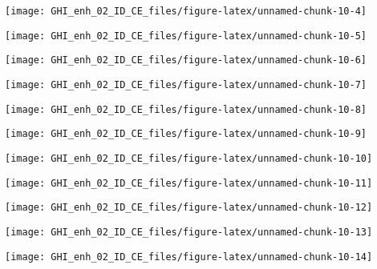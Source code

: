 \documentclass[
  10pt,
  a4paper,oneside]{article}
\begin{document}
\begin{center}\texttt{[image: GHI\_enh\_02\_ID\_CE\_files/figure-latex/unnamed-chunk-10-4]} \end{center}

\begin{center}\texttt{[image: GHI\_enh\_02\_ID\_CE\_files/figure-latex/unnamed-chunk-10-5]} \end{center}

\begin{center}\texttt{[image: GHI\_enh\_02\_ID\_CE\_files/figure-latex/unnamed-chunk-10-6]} \end{center}

\begin{center}\texttt{[image: GHI\_enh\_02\_ID\_CE\_files/figure-latex/unnamed-chunk-10-7]} \end{center}

\begin{center}\texttt{[image: GHI\_enh\_02\_ID\_CE\_files/figure-latex/unnamed-chunk-10-8]} \end{center}

\begin{center}\texttt{[image: GHI\_enh\_02\_ID\_CE\_files/figure-latex/unnamed-chunk-10-9]} \end{center}

\begin{center}\texttt{[image: GHI\_enh\_02\_ID\_CE\_files/figure-latex/unnamed-chunk-10-10]} \end{center}

\begin{center}\texttt{[image: GHI\_enh\_02\_ID\_CE\_files/figure-latex/unnamed-chunk-10-11]} \end{center}

\begin{center}\texttt{[image: GHI\_enh\_02\_ID\_CE\_files/figure-latex/unnamed-chunk-10-12]} \end{center}

\begin{center}\texttt{[image: GHI\_enh\_02\_ID\_CE\_files/figure-latex/unnamed-chunk-10-13]} \end{center}

\begin{center}\texttt{[image: GHI\_enh\_02\_ID\_CE\_files/figure-latex/unnamed-chunk-10-14]} \end{center}
\end{document}
